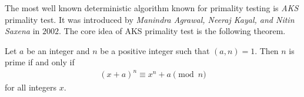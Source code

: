\documentclass{subfiles}
\begin{document}
	The most well known deterministic algorithm known for primality testing is \textit{AKS} primality test. It was introduced by \textit{Manindra Agrawal, Neeraj Kayal, and Nitin Saxena} in $2002$. The core idea of AKS primality test is the following theorem.
		\begin{theorem}
			Let $a$ be an integer and $n$ be a positive integer such that $(a,n)=1$. Then $n$ is prime if and only if
				\begin{align*}
					(x+a)^n \equiv x^n + a \pmod n
				\end{align*}
			for all integers $x$.
		\end{theorem}
\end{document}
